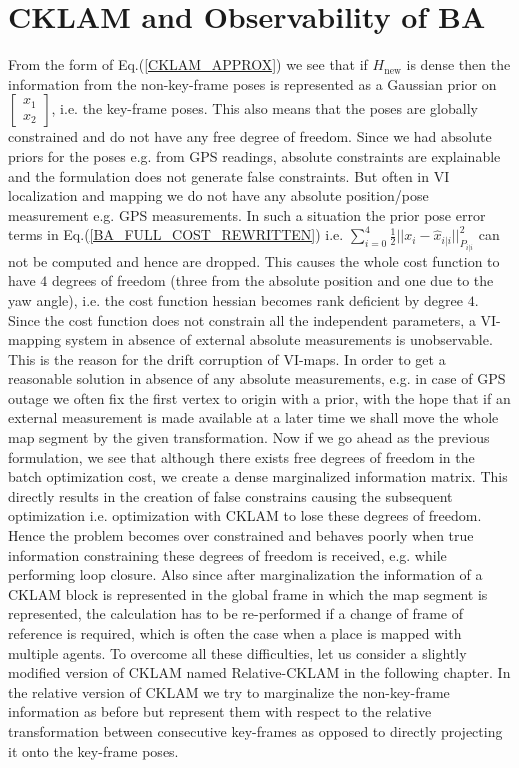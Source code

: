 \section{CKLAM and Observability of BA}
\label{cklamObservability}
From the form of Eq.(\ref{CKLAM_APPROX}) we see that if $H_\mathrm{new}$ is dense then the information from the non-key-frame poses is represented as a Gaussian prior on $\begin{bmatrix} x_{1} \\ x_{2} \end{bmatrix}$, i.e. the key-frame poses. This also means that the poses are globally constrained and do not have any free degree of freedom. Since we had absolute priors for the poses e.g. from GPS readings, absolute constraints are explainable and the formulation does not generate false constraints. But often in VI localization and mapping we do not have any absolute position/pose measurement e.g. GPS measurements. In such a situation the prior pose error terms in Eq.(\ref{BA_FULL_COST_REWRITTEN}) i.e. $\sum_{i=0}^4 \frac{1}{2}||x_i-\hat x_{i|i}||^2_{P_{i|i}}$ can not be computed and hence are dropped. This causes the whole cost function to have $4$ degrees of freedom (three from the absolute position and one due to the yaw angle), i.e. the cost function hessian becomes rank deficient by degree $4$. Since the cost function does not constrain all the independent parameters, a VI-mapping system in absence of external absolute measurements is unobservable. This is the reason for the drift corruption of VI-maps. In order to get a reasonable solution in absence of any absolute measurements, e.g. in case of GPS outage we often fix the first vertex to origin with a prior, with the hope that if an external measurement is made available at a later time we shall move the whole map segment by the given transformation. Now if we go ahead as the previous formulation, we see that although there exists free degrees of freedom in the batch optimization cost, we create a dense marginalized information matrix. This directly results in the creation of false constrains causing the subsequent optimization i.e. optimization with CKLAM to lose these degrees of freedom. Hence the problem becomes over constrained and behaves poorly when true information constraining these degrees of freedom is received, e.g. while performing loop closure. Also since after marginalization the information of a CKLAM block is represented in the global frame in which the map segment is represented, the calculation has to be re-performed if a change of frame of reference is required, which is often the case when a place is mapped with multiple agents. To overcome all these difficulties, let us consider a slightly modified version of CKLAM named Relative-CKLAM in the following chapter. In the relative version of CKLAM we try to marginalize the non-key-frame information as before but represent them with respect to the relative transformation between consecutive key-frames as opposed to directly projecting it onto the key-frame poses.

